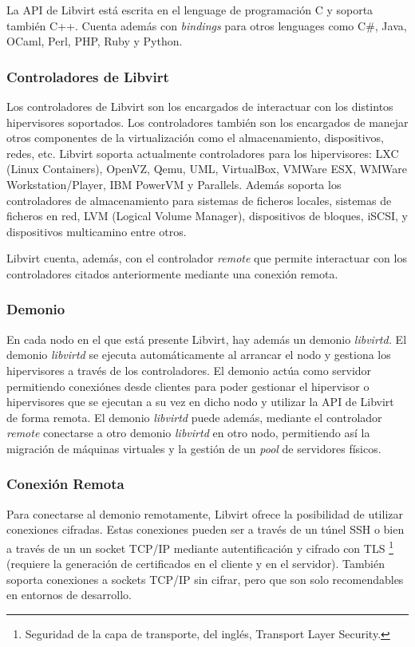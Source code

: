 \documentclass[spanisheDIVcalc,twoside,parskip-,pointlessnumbers,final]{scrbook}
\begin{document}
La API de Libvirt está escrita en el lenguage de programación C y
soporta también C++. Cuenta además con \emph{bindings} para otros
lenguages como C\#, Java, OCaml, Perl, PHP, Ruby y Python.


\subsubsection{Controladores de Libvirt}

Los controladores de Libvirt son los encargados de interactuar con
los distintos hipervisores soportados. Los controladores también son
los encargados de manejar otros componentes de la virtualización como
el almacenamiento, dispositivos, redes, etc. Libvirt soporta actualmente
controladores para los hipervisores: LXC (Linux Containers), OpenVZ,
Qemu, UML, VirtualBox, VMWare ESX, WMWare Workstation/Player, IBM
PowerVM y Parallels. Además soporta los controladores de almacenamiento
para sistemas de ficheros locales, sistemas de ficheros en red, LVM
(Logical Volume Manager), dispositivos de bloques, iSCSI, y dispositivos
multicamino entre otros.

Libvirt cuenta, además, con el controlador\emph{ remote }que permite
interactuar con los controladores citados anteriormente mediante una
conexión remota.


\subsubsection{Demonio}

En cada nodo en el que está presente Libvirt, hay además un demonio
\emph{libvirtd.} El demonio \emph{libvirtd} se ejecuta automáticamente
al arrancar el nodo y gestiona los hipervisores a través de los controladores.
El demonio actúa como servidor permitiendo conexiónes desde clientes
para poder gestionar el hipervisor o hipervisores que se ejecutan
a su vez en dicho nodo y utilizar la API de Libvirt de forma remota.
El demonio \emph{libvirtd }puede además, mediante el controlador \emph{remote}
conectarse a otro demonio \emph{libvirtd} en otro nodo, permitiendo
así la migración de máquinas virtuales y la gestión de un \emph{pool}
de servidores físicos.


\subsubsection{Conexión Remota}

Para conectarse al demonio remotamente, Libvirt ofrece la posibilidad
de utilizar conexiones cifradas. Estas conexiones pueden ser a través
de un túnel SSH o bien a través de un un socket TCP/IP mediante autentificación
y cifrado con TLS%
\footnote{Seguridad de la capa de transporte, del inglés, Transport Layer Security.%
} (requiere la generación de certificados en el cliente y en el servidor).
También soporta conexiones a sockets TCP/IP sin cifrar, pero que son
solo recomendables en entornos de desarrollo.
\end{document}
